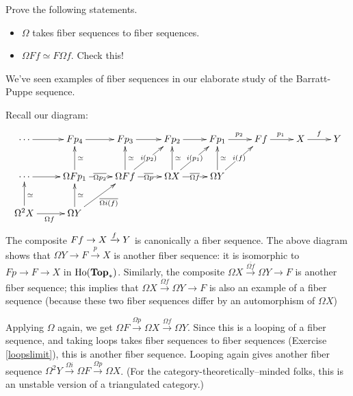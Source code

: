 \begin{exercise}\label{loopslimit}
    Prove the following statements.
    \begin{itemize}
	\item $\Omega$ takes fiber sequences to fiber sequences.
	\item $\Omega Ff\simeq F\Omega f$. Check this!
    \end{itemize}
\end{exercise}

We've seen examples of fiber sequences in our elaborate study of the Barratt-Puppe sequence.
\begin{example}
Recall our diagram:
\begin{equation*}
    \xymatrix{
	\cdots\ar[r] & Fp_4\ar[r] & Fp_3 \ar[r] & Fp_2\ar[r] & Fp_1\ar[r]^{p_2} & Ff\ar[r]^{p_1} & X\ar[r]^{f} & Y\\
    \cdots\ar[r] & \Omega Fp_1\ar[r]|{\overline{\Omega p_2}}\ar[u]_{\simeq} & \Omega Ff\ar[u]_{\simeq}\ar[ur]|{i(p_2)}\ar[r]|{\overline{\Omega p}} & \Omega X\ar[r]|{\overline{\Omega f}}\ar[u]_{\simeq}\ar[ur]|{i(p_1)} & \Omega Y\ar[u]_\simeq \ar[ur]|{i(f)} & &\\
	\Omega^2 X\ar[u]_{\simeq}\ar[r]_{\Omega f} & \Omega Y\ar[u]_{\simeq}\ar[ur]_{\overline{\Omega i(f)}} & & &
    }
\end{equation*}
The composite $Ff\to X\xrightarrow{{f}} Y$ is canonically a fiber sequence.
The above diagram shows that $\Omega Y\to F\xrightarrow{p}X$ is another fiber sequence: it is isomorphic to
$Fp\to F\to X$ in $\mathrm{Ho}(\mathbf{Top}_\ast)$.
Similarly, the composite $\Omega X\xrightarrow{\overline{\Omega f}}\Omega Y\to F$ is another fiber sequence;
this implies that $\Omega X\xrightarrow{\Omega f}\Omega Y\to F$ is also an example of a fiber sequence
(because these two fiber sequences differ by an automorphism of $\Omega X$)

Applying $\Omega$ again, we get $\Omega F\xrightarrow{\Omega p} \Omega X\xrightarrow{\Omega f} \Omega Y$.
Since this is a looping of a fiber sequence, and taking loops takes fiber sequences to fiber sequences (Exercise \ref{loopslimit}), this is another fiber sequence. 
Looping again gives another fiber sequence $\Omega^2 Y\xrightarrow{\Omega i} \Omega F\xrightarrow{\Omega p}\Omega X$.
(For the category-theoretically--minded folks, this is an unstable version of a triangulated category.)
\end{example}

